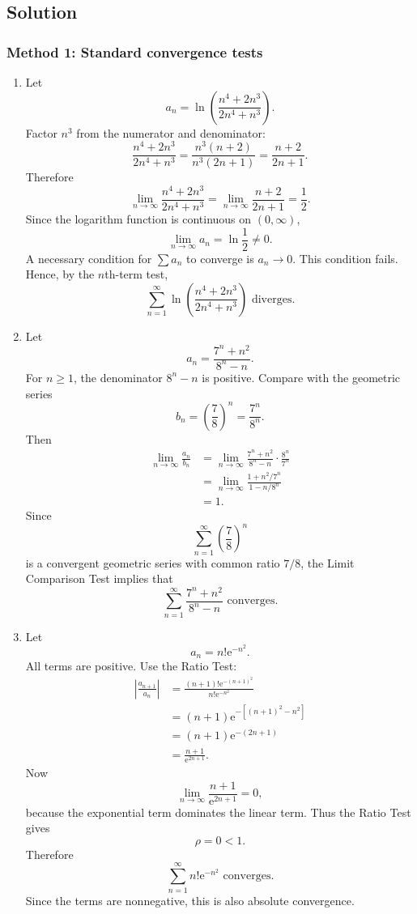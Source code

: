 \documentclass[12pt]{article}
\newcommand{\ee}{\mathrm{e}}
\begin{document}
\subsection{Solution}

\subsubsection{Method 1: Standard convergence tests}

\begin{enumerate}[label=(\alph*)]
\item Let
\[
a_n=\ln\left(\frac{n^4+2n^3}{2n^4+n^3}\right).
\]
Factor $n^3$ from the numerator and denominator:
\[
\frac{n^4+2n^3}{2n^4+n^3}
=
\frac{n^3(n+2)}{n^3(2n+1)}
=
\frac{n+2}{2n+1}.
\]
Therefore
\[
\lim_{n\to\infty}\frac{n^4+2n^3}{2n^4+n^3}
=
\lim_{n\to\infty}\frac{n+2}{2n+1}
=
\frac12.
\]
Since the logarithm function is continuous on $(0,\infty)$,
\[
\lim_{n\to\infty}a_n
=
\ln\frac12
\ne 0.
\]
A necessary condition for $\sum a_n$ to converge is $a_n\to 0$. This condition fails. Hence, by the $n$th-term test,
\[
\boxed{\sum_{n=1}^{\infty}
\ln\left(\frac{n^4+2n^3}{2n^4+n^3}\right)
\text{ diverges}.}
\]



\newpage
\item Let
\[
a_n=\frac{7^n+n^2}{8^n-n}.
\]
For $n\ge 1$, the denominator $8^n-n$ is positive. Compare with the geometric series
\[
b_n=\left(\frac78\right)^n=\frac{7^n}{8^n}.
\]
Then
\begin{align*}
\lim_{n\to\infty}\frac{a_n}{b_n}
&=
\lim_{n\to\infty}
\frac{7^n+n^2}{8^n-n}\cdot \frac{8^n}{7^n}\\
&=
\lim_{n\to\infty}
\frac{1+n^2/7^n}{1-n/8^n}\\
&=1.
\end{align*}
Since
\[
\sum_{n=1}^{\infty}\left(\frac78\right)^n
\]
is a convergent geometric series with common ratio $7/8$, the Limit Comparison Test implies that
\[
\boxed{\sum_{n=1}^{\infty}
\frac{7^n+n^2}{8^n-n}
\text{ converges}.}
\]

\item Let
\[
a_n=n!\ee^{-n^2}.
\]
All terms are positive. Use the Ratio Test:
\begin{align*}
\left|\frac{a_{n+1}}{a_n}\right|
&=
\frac{(n+1)!\ee^{-(n+1)^2}}{n!\ee^{-n^2}}\\
&=(n+1)\ee^{-[(n+1)^2-n^2]}\\
&=(n+1)\ee^{-(2n+1)}\\
&=\frac{n+1}{\ee^{2n+1}}.
\end{align*}
Now
\[
\lim_{n\to\infty}\frac{n+1}{\ee^{2n+1}}=0,
\]
because the exponential term dominates the linear term. Thus the Ratio Test gives
\[
\rho=0<1.
\]
Therefore
\[
\boxed{\sum_{n=1}^{\infty}n!\ee^{-n^2}\text{ converges}.}
\]
Since the terms are nonnegative, this is also absolute convergence.
\end{enumerate}
\end{document}
